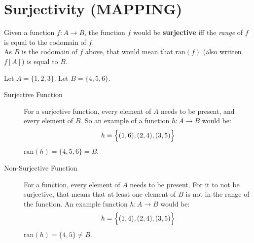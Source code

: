 \documentclass[../notes.tex]{subfiles}
\begin{document}
		\section[Surjectivity]{Surjectivity (MAPPING)}
			Given a function $f: A \rightarrow B$, the function $f$ would be \textbf{surjective} iff the \textit{range} of $f$ is equal to the codomain of $f$.\\
			As $B$ is the codomain of $f$ above, that would mean that $\mathrm{ran}(f)$ (also written $f[A]$) is equal to $B$.
			\begin{example}
				Let $A = \{1, 2, 3\}$. Let $B = \{4, 5, 6\}$.
				\begin{description}
					\item[Surjective Function] For a surjective function, every element of $A$ needs to be present, and every element of $B$. So an example of a function $h: A \rightarrow B$ would be:
						\begin{align*}
							h = \Bigl\{(1, 6), (2, 4), (3, 5)\Bigr\}
						\end{align*}
						$\mathrm{ran}(h) = \{4, 5, 6\} = B$.
					\item[Non-Surjective Function] For a function, every element of $A$ needs to be present. For it to not be surjective, that means that at least one element of $B$ is not in the range of the function. An example function $h: A \rightarrow B$ would be:
						\begin{align*}
							h = \Bigl\{(1, 4), (2, 4), (3, 5)\Bigr\}
						\end{align*}
						$\mathrm{ran}(h) = \{4, 5\} \neq B$.
				\end{description}
			\end{example}
\end{document}
